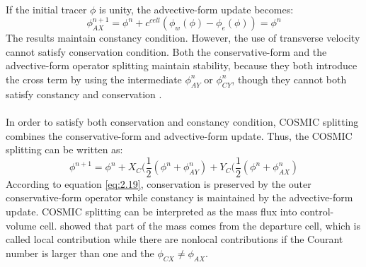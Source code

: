\paragraph{}
If the initial tracer $\phi $ is unity, the advective-form update becomes:
\begin{equation} \label{eq:2.18}
\phi^{n+1}_{\scriptscriptstyle AX} = \phi^{n}+c^{cell}(\phi_w(\phi )-\phi_e(\phi )) = \phi^{n}
\end{equation}
The results maintain constancy condition. However, the use of transverse velocity cannot satisfy conservation condition. Both the conservative-form and the advective-form operator splitting  maintain stability, because they both introduce the cross term by using the intermediate $\phi^{n}_{\scriptscriptstyle AY}$ or $\phi^{n}_{\scriptscriptstyle CY}$, though they cannot both satisfy constancy and conservation \citep{Leonard1996}.
\paragraph{}
In order to satisfy both conservation and constancy condition, COSMIC splitting \citep{Leonard1996} combines the conservative-form and advective-form update. Thus, the COSMIC splitting can be written as:
\begin{equation} \label{eq:2.19}
\phi^{n+1} = \phi^n+X_{\scriptscriptstyle C}(\frac{1}{2}(\phi^n + \phi^n _{\scriptscriptstyle AY}) +Y_{\scriptscriptstyle C}(\frac{1}{2}(\phi^n + \phi^n _{\scriptscriptstyle AX})
\end{equation}
According to equation \ref{eq:2.19}, conservation is preserved by the outer conservative-form operator while constancy is maintained by the advective-form update. COSMIC splitting can be interpreted as the mass flux into control-volume cell. \cite{Lauritzen2007} showed that part of the mass comes from the departure cell, which is called local contribution  while there are nonlocal contributions if the Courant number is larger than one and the $\phi_{CX} \neq \phi_{AX}$.
